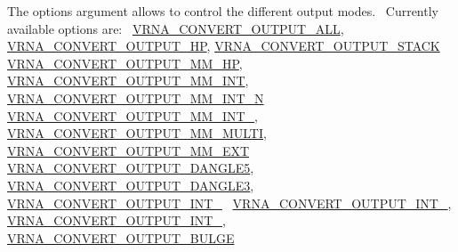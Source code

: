 The options argument allows to control the different output modes.~\newline
Currently available options are\+:~\newline
\hyperlink{group__energy__parameters__convert_ga8dc6aee5a806c49b71557152f9616bc4}{V\+R\+N\+A\+\_\+\+C\+O\+N\+V\+E\+R\+T\+\_\+\+O\+U\+T\+P\+U\+T\+\_\+\+A\+L\+L}, \hyperlink{group__energy__parameters__convert_gaf66fe2cb11dfcfd32d791049c254a8a4}{V\+R\+N\+A\+\_\+\+C\+O\+N\+V\+E\+R\+T\+\_\+\+O\+U\+T\+P\+U\+T\+\_\+\+H\+P}, \hyperlink{group__energy__parameters__convert_gad23522d63f8d4c50d5a5deee9bee3ef2}{V\+R\+N\+A\+\_\+\+C\+O\+N\+V\+E\+R\+T\+\_\+\+O\+U\+T\+P\+U\+T\+\_\+\+S\+T\+A\+C\+K}~\newline
\hyperlink{group__energy__parameters__convert_gaa892c7b4957459090f3e08da298cc347}{V\+R\+N\+A\+\_\+\+C\+O\+N\+V\+E\+R\+T\+\_\+\+O\+U\+T\+P\+U\+T\+\_\+\+M\+M\+\_\+\+H\+P}, \hyperlink{group__energy__parameters__convert_ga4ff223fb1f9c62cd92d9ab811ad03d55}{V\+R\+N\+A\+\_\+\+C\+O\+N\+V\+E\+R\+T\+\_\+\+O\+U\+T\+P\+U\+T\+\_\+\+M\+M\+\_\+\+I\+N\+T}, \hyperlink{group__energy__parameters__convert_gaf5d3743219f83c6348155cd81e755bbb}{V\+R\+N\+A\+\_\+\+C\+O\+N\+V\+E\+R\+T\+\_\+\+O\+U\+T\+P\+U\+T\+\_\+\+M\+M\+\_\+\+I\+N\+T\+\_\+N}~\newline
\hyperlink{group__energy__parameters__convert_ga78382ec622ba99e0ac2262317bdd7316}{V\+R\+N\+A\+\_\+\+C\+O\+N\+V\+E\+R\+T\+\_\+\+O\+U\+T\+P\+U\+T\+\_\+\+M\+M\+\_\+\+I\+N\+T\+\_}, \hyperlink{group__energy__parameters__convert_gae67af9f1cdf7baf2865481282a5d1034}{V\+R\+N\+A\+\_\+\+C\+O\+N\+V\+E\+R\+T\+\_\+\+O\+U\+T\+P\+U\+T\+\_\+\+M\+M\+\_\+\+M\+U\+L\+T\+I}, \hyperlink{group__energy__parameters__convert_gaf14ead7ef1fdbe725ade653750fc51e3}{V\+R\+N\+A\+\_\+\+C\+O\+N\+V\+E\+R\+T\+\_\+\+O\+U\+T\+P\+U\+T\+\_\+\+M\+M\+\_\+\+E\+X\+T}~\newline
\hyperlink{group__energy__parameters__convert_ga036ffd996d8c8a9acf631760dd1da24b}{V\+R\+N\+A\+\_\+\+C\+O\+N\+V\+E\+R\+T\+\_\+\+O\+U\+T\+P\+U\+T\+\_\+\+D\+A\+N\+G\+L\+E5}, \hyperlink{group__energy__parameters__convert_ga34a8a5479ef885834ef32f3fb43d79bc}{V\+R\+N\+A\+\_\+\+C\+O\+N\+V\+E\+R\+T\+\_\+\+O\+U\+T\+P\+U\+T\+\_\+\+D\+A\+N\+G\+L\+E3}, \hyperlink{group__energy__parameters__convert_ga079aafefd5f8ab57ee5120099a34bd25}{V\+R\+N\+A\+\_\+\+C\+O\+N\+V\+E\+R\+T\+\_\+\+O\+U\+T\+P\+U\+T\+\_\+\+I\+N\+T\+\_}~\newline
\hyperlink{group__energy__parameters__convert_gacf770881d9034431ebe741642342a1f9}{V\+R\+N\+A\+\_\+\+C\+O\+N\+V\+E\+R\+T\+\_\+\+O\+U\+T\+P\+U\+T\+\_\+\+I\+N\+T\+\_}, \hyperlink{group__energy__parameters__convert_gaa307671e2631cdacad9cbe4c6583b05f}{V\+R\+N\+A\+\_\+\+C\+O\+N\+V\+E\+R\+T\+\_\+\+O\+U\+T\+P\+U\+T\+\_\+\+I\+N\+T\+\_}, \hyperlink{group__energy__parameters__convert_ga7092fe0be4de6f02cc0bf08e81af726a}{V\+R\+N\+A\+\_\+\+C\+O\+N\+V\+E\+R\+T\+\_\+\+O\+U\+T\+P\+U\+T\+\_\+\+B\+U\+L\+G\+E}~\newline
